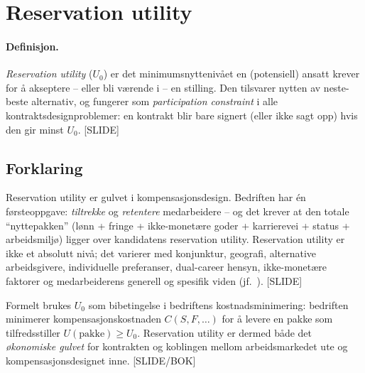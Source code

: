 \section{Reservation utility}\label{thr:reservation-utility}

\paragraph{Definisjon.} \emph{Reservation utility} ($U_0$) er det minimumsnyttenivået en (potensiell) ansatt krever for å akseptere -- eller bli værende i -- en stilling. Den tilsvarer nytten av neste-beste alternativ, og fungerer som \emph{participation constraint} i alle kontraktsdesignproblemer: en kontrakt blir bare signert (eller ikke sagt opp) hvis den gir minst $U_0$. [SLIDE]

\subsection*{Forklaring}

Reservation utility er gulvet i kompensasjonsdesign. Bedriften har én førsteoppgave: \emph{tiltrekke} og \emph{retentere} medarbeidere -- og det krever at den totale ``nyttepakken'' (lønn + fringe + ikke-monetære goder + karrierevei + status + arbeidsmiljø) ligger over kandidatens reservation utility. Reservation utility er ikke et absolutt nivå; det varierer med konjunktur, geografi, alternative arbeidsgivere, individuelle preferanser, dual-career hensyn, ikke-monetære faktorer og medarbeiderens generell og spesifik viden (jf.\ ). [SLIDE]

Formelt brukes $U_0$ som bibetingelse i bedriftens kostnadsminimering: bedriften minimerer kompensasjonskostnaden $C(S,F,\ldots)$ for å levere en pakke som tilfredsstiller $U(\text{pakke}) \geq U_0$. Reservation utility er dermed både det \emph{økonomiske gulvet} for kontrakten og koblingen mellom arbeidsmarkedet ute og kompensasjonsdesignet inne. [SLIDE/BOK]

